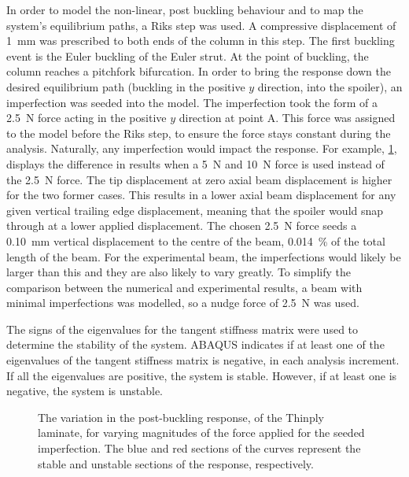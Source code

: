 \documentclass{IEEEtran}
\begin{document}
    In order to model the non-linear, post buckling behaviour and to map the system's equilibrium paths, a Riks step was used. A compressive displacement of \SI{1}{\milli\meter} was prescribed to both ends of the column in this step. The first buckling event is the Euler buckling of the Euler strut. At the point of buckling, the column reaches a pitchfork bifurcation. In order to bring the response down the desired equilibrium path (buckling in the positive $y$ direction, into the spoiler), an imperfection was seeded into the model. The imperfection took the form of a \SI{2.5}{\newton} force acting in the positive $y$ direction at point A. This force was assigned to the model before the Riks step, to ensure the force stays constant during the analysis. Naturally, any imperfection would impact the response. For example, \cref{fig:Imperfect}, displays the difference in results when a \SI{5}{\newton} and \SI{10}{\newton} force is used instead of the \SI{2.5}{\newton} force. The tip displacement at zero axial beam displacement is higher for the two former cases. This results in a lower axial beam displacement for any given vertical trailing edge displacement, meaning that the spoiler would snap through at a lower applied displacement. The chosen \SI{2.5}{\newton} force seeds a \SI{0.10}{\milli\meter} vertical displacement to the centre of the beam, \SI{0.014}{\percent} of the total length of the beam. For the experimental beam, the imperfections would likely be larger than this and they are also likely to vary greatly. To simplify the comparison between the numerical and experimental results, a beam with minimal imperfections was modelled, so a nudge force of \SI{2.5}{\newton} was used. 

    The signs of the eigenvalues for the tangent stiffness matrix were used to determine the stability of the system. ABAQUS indicates if at least one of the eigenvalues of the tangent stiffness matrix is negative, in each analysis increment. If all the eigenvalues are positive, the system is stable. However, if at least one is negative, the system is unstable. 
   

    \begin{figure}[!h]
        \footnotesize
        \centering
        
        \caption{ The variation in the post-buckling response, of the Thinply laminate, for varying magnitudes of the force applied for the seeded imperfection. The blue and red sections of the curves represent the stable and unstable sections of the response, respectively.}
        \label{fig:Imperfect}
    \end{figure}
    \normalfont
\end{document}

